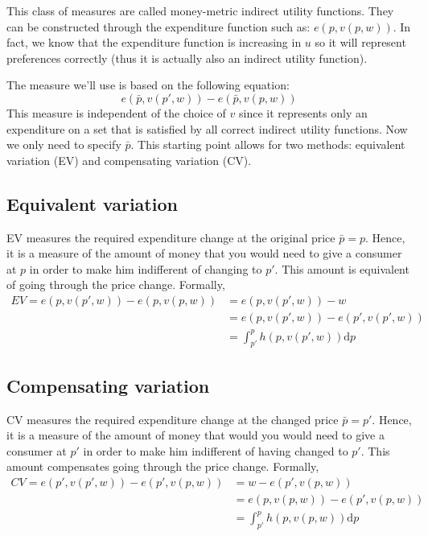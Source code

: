 \documentclass[12pt]{report}
\def\D{\mathrm{d}}
\begin{document}
This class of measures are called money-metric indirect utility functions. They can be constructed through the expenditure function such as: $e(p, v(p,w))$. In fact, we know that the expenditure function is increasing in $u$ so it will represent preferences correctly (thus it is actually also an indirect utility function).

The measure we'll use is based on the following equation: $$e(\bar p, v(p', w)) - e(\bar p, v(p, w)) $$ This measure is independent of the choice of $v$ since it represents only an expenditure on a set that is satisfied by all correct indirect utility functions. Now we only need to specify $\bar p$. This starting point allows for two methods: equivalent variation (EV) and compensating variation (CV).

\subsection{Equivalent variation}

EV measures the required expenditure change at the original price $\bar p = p$. Hence, it is a measure of the amount of money that you would need to give a consumer at $p$ in order to make him indifferent of changing to $p'$. This amount is equivalent of going through the price change. Formally, \begin{align*} 
EV = e(p, v(p',w)) - e(p, v(p,w)) & = e(p, v(p',w)) - w \\
& = e(p, v(p',w)) - e(p', v(p',w)) \\
& = \int_{p'}^{p} h(p, v(p',w))\D p
\end{align*}

\subsection{Compensating variation}

CV measures the required expenditure change at the changed price $\bar{p} = p'$. Hence, it is a measure of the amount of money that would you would need to give a consumer at $p'$ in order to make him indifferent of having changed to $p'$. This amount compensates going through the price change. Formally, \begin{align*} 
CV = e(p', v(p',w)) - e(p', v(p,w)) & = w - e(p', v(p,w)) \\
& = e(p, v(p,w)) - e(p', v(p,w)) \\
& = \int_{p'}^{p} h(p, v(p,w))\D p
\end{align*}
\end{document}
